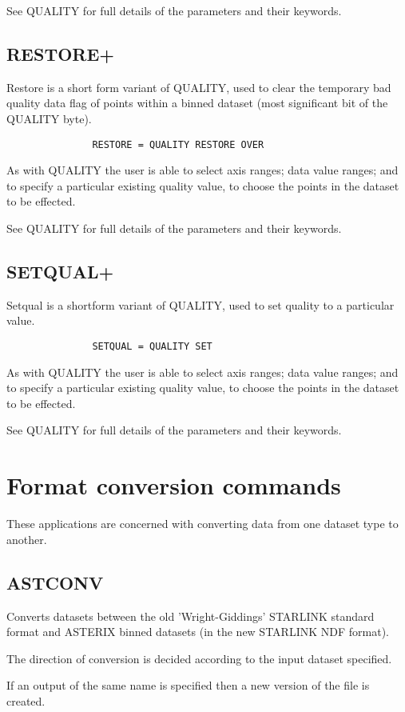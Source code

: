 \documentclass{book}
\renewcommand{\_}{{\tt\char'137}}     %
\begin{document}
See QUALITY for full details of the parameters and their keywords.
 
\section{RESTORE+}
Restore is a short form variant of QUALITY, used to clear the
temporary bad quality data flag of points within a binned
dataset (most significant bit of the QUALITY byte).
 
\begin{verbatim}
               RESTORE = QUALITY RESTORE OVER
\end{verbatim}
As with QUALITY the user is able to select axis ranges; data
value ranges; and to specify a particular existing quality value,
to choose the points in the dataset to be effected.
 
See QUALITY for full details of the parameters and their keywords.
 
\section{SETQUAL+}
Setqual is a shortform variant of QUALITY, used to set
quality to a particular value.
\begin{verbatim}
               SETQUAL = QUALITY SET
\end{verbatim}
As with QUALITY the user is able to select axis ranges; data
value ranges; and to specify a particular existing quality value,
to choose the points in the dataset to be effected.
 
See QUALITY for full details of the parameters and their keywords.
 
\chapter{Format conversion commands}
These applications are concerned with converting data from one
dataset type to another.
 
\section{ASTCONV}
Converts datasets between the old 'Wright-Giddings' STARLINK
standard format and ASTERIX binned datasets (in the new
STARLINK NDF format).
 
The direction of conversion is decided according to the input
dataset specified.
 
If an output of the same name is specified then a new version
of the file is created.
 
\end{document}
